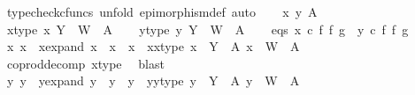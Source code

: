 \begin{isabellebody}
\ {\isacharparenleft}{\kern0pt}typecheck{\isacharunderscore}{\kern0pt}cfuncs{\isacharcomma}{\kern0pt}\ unfold\ epimorphism{\isacharunderscore}{\kern0pt}def{}{\isacharcomma}{\kern0pt}\ auto{\isacharparenright}{\kern0pt}\isanewline
\ \ \isamarkupfalse%
\ x\ y\ A\isanewline
\ \ \isamarkupfalse%
\ x{\isacharunderscore}{\kern0pt}type{\isacharcolon}{\kern0pt}\ {\isachardoublequoteopen}x{\isacharcolon}{\kern0pt}\ Y\ {\isasymCoprod}\ W\ {\isasymrightarrow}\ A{\isachardoublequoteclose}\isanewline
\ \ \isamarkupfalse%
\ y{\isacharunderscore}{\kern0pt}type{\isacharcolon}{\kern0pt}\ {\isachardoublequoteopen}y{\isacharcolon}{\kern0pt}\ Y\ {\isasymCoprod}\ W\ {\isasymrightarrow}\ A{\isachardoublequoteclose}\isanewline
\ \ \isamarkupfalse%
\ eqs{\isacharcolon}{\kern0pt}\ {\isachardoublequoteopen}x\ {\isasymcirc}\isactrlsub c\ f\ {\isasymbowtie}\isactrlsub f\ g\ {\isacharequal}{\kern0pt}\ y\ {\isasymcirc}\isactrlsub c\ f\ {\isasymbowtie}\isactrlsub f\ g{\isachardoublequoteclose}\isanewline
\isanewline
\ \ \isamarkupfalse%
\ x{}\ x{}\ \ x{\isacharunderscore}{\kern0pt}expand{\isacharcolon}{\kern0pt}\ {\isachardoublequoteopen}x\ {\isacharequal}{\kern0pt}\ x{}\ {\isasymamalg}\ x{}{\isachardoublequoteclose}\ \ x{}{\isacharunderscore}{\kern0pt}x{}{\isacharunderscore}{\kern0pt}type{\isacharcolon}{\kern0pt}\ {\isachardoublequoteopen}x{}\ {\isacharcolon}{\kern0pt}\ Y\ {\isasymrightarrow}\ A{\isachardoublequoteclose}\ {\isachardoublequoteopen}x{}\ {\isacharcolon}{\kern0pt}\ W\ {\isasymrightarrow}\ A{\isachardoublequoteclose}\isanewline
\ \ \ \ \isamarkupfalse%
\ coprod{\isacharunderscore}{\kern0pt}decomp\ x{\isacharunderscore}{\kern0pt}type\ \isamarkupfalse%
\ blast\isanewline
\ \ \isamarkupfalse%
\ y{}\ y{}\ \ y{\isacharunderscore}{\kern0pt}expand{\isacharcolon}{\kern0pt}\ {\isachardoublequoteopen}y\ {\isacharequal}{\kern0pt}\ y{}\ {\isasymamalg}\ y{}{\isachardoublequoteclose}\ \ y{}{\isacharunderscore}{\kern0pt}y{}{\isacharunderscore}{\kern0pt}type{\isacharcolon}{\kern0pt}\ {\isachardoublequoteopen}y{}\ {\isacharcolon}{\kern0pt}\ Y\ {\isasymrightarrow}\ A{\isachardoublequoteclose}\ {\isachardoublequoteopen}y{}\ {\isacharcolon}{\kern0pt}\ W\ {\isasymrightarrow}\ A{\isachardoublequoteclose}\isanewline

\end{isabellebody}
